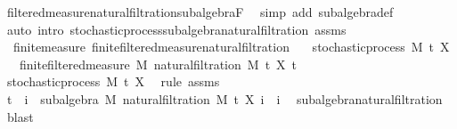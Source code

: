 \begin{isabellebody}
\ filtered{\isacharunderscore}{\kern0pt}measure{\isacharunderscore}{\kern0pt}natural{\isacharunderscore}{\kern0pt}filtration{\isachardot}{\kern0pt}subalgebra{\isacharunderscore}{\kern0pt}F\ \isamarkupfalse%
\ {\isacharparenleft}{\kern0pt}simp\ add{\isacharcolon}{\kern0pt}\ subalgebra{\isacharunderscore}{\kern0pt}def{\isacharparenright}{\kern0pt}\isanewline
{}\isamarkupfalse%
\ {\isacharparenleft}{\kern0pt}auto\ intro{\isacharcolon}{\kern0pt}\ stochastic{\isacharunderscore}{\kern0pt}process{\isachardot}{\kern0pt}subalgebra{\isacharunderscore}{\kern0pt}natural{\isacharunderscore}{\kern0pt}filtration\ assms{\isacharparenleft}{\kern0pt}{}{\isacharparenright}{\kern0pt}{\isacharparenright}{\kern0pt}%
\endisatagproof
{\isafoldproof}%
%
\isadelimproof
\isanewline
%
\endisadelimproof
\isanewline
{}\isamarkupfalse%
\ {\isacharparenleft}{\kern0pt}\ finite{\isacharunderscore}{\kern0pt}measure{\isacharparenright}{\kern0pt}\ finite{\isacharunderscore}{\kern0pt}filtered{\isacharunderscore}{\kern0pt}measure{\isacharunderscore}{\kern0pt}natural{\isacharunderscore}{\kern0pt}filtration{\isacharcolon}{\kern0pt}\isanewline
\ \ \ {\isachardoublequoteopen}stochastic{\isacharunderscore}{\kern0pt}process\ M\ t\ X{\isachardoublequoteclose}\isanewline
\ \ \ {\isachardoublequoteopen}finite{\isacharunderscore}{\kern0pt}filtered{\isacharunderscore}{\kern0pt}measure\ M\ {\isacharparenleft}{\kern0pt}natural{\isacharunderscore}{\kern0pt}filtration\ M\ t\ X{\isacharparenright}{\kern0pt}\ t\isanewline
%
\isadelimproof
%
\endisadelimproof
%
\isatagproof
{}\isamarkupfalse%
\isanewline
\ \ \isamarkupfalse%
\ stochastic{\isacharunderscore}{\kern0pt}process\ M\ t\ X\ \isamarkupfalse%
\ {\isacharparenleft}{\kern0pt}rule\ assms{\isacharparenright}{\kern0pt}\isanewline
\ \ \isamarkupfalse%
\ {\isachardoublequoteopen}t\ {\isasymle}\ i\ {\isasymLongrightarrow}\ subalgebra\ M\ {\isacharparenleft}{\kern0pt}natural{\isacharunderscore}{\kern0pt}filtration\ M\ t\ X\ i{\isacharparenright}{\kern0pt}{\isachardoublequoteclose}\ \ i\ \isamarkupfalse%
\ subalgebra{\isacharunderscore}{\kern0pt}natural{\isacharunderscore}{\kern0pt}filtration\ \isamarkupfalse%
\ blast\isanewline
\ \ \isamarkupfalse%

\end{isabellebody}
